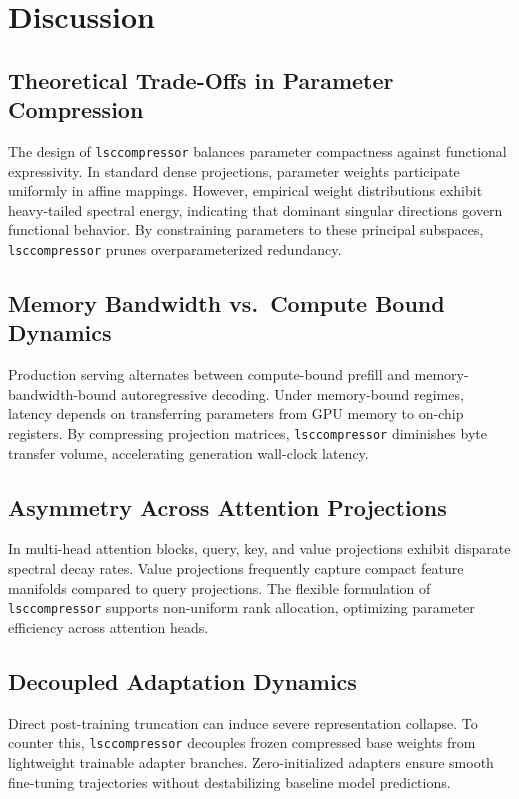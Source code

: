 \section{Discussion}

\subsection{Theoretical Trade-Offs in Parameter Compression}
The design of \texttt{lsccompressor} balances parameter compactness against functional expressivity. In standard dense projections, parameter weights participate uniformly in affine mappings. However, empirical weight distributions exhibit heavy-tailed spectral energy, indicating that dominant singular directions govern functional behavior. By constraining parameters to these principal subspaces, \texttt{lsccompressor} prunes overparameterized redundancy.

\subsection{Memory Bandwidth vs.\ Compute Bound Dynamics}
Production serving alternates between compute-bound prefill and memory-bandwidth-bound autoregressive decoding. Under memory-bound regimes, latency depends on transferring parameters from GPU memory to on-chip registers. By compressing projection matrices, \texttt{lsccompressor} diminishes byte transfer volume, accelerating generation wall-clock latency.

\subsection{Asymmetry Across Attention Projections}
In multi-head attention blocks, query, key, and value projections exhibit disparate spectral decay rates. Value projections frequently capture compact feature manifolds compared to query projections. The flexible formulation of \texttt{lsccompressor} supports non-uniform rank allocation, optimizing parameter efficiency across attention heads.

\subsection{Decoupled Adaptation Dynamics}
Direct post-training truncation can induce severe representation collapse. To counter this, \texttt{lsccompressor} decouples frozen compressed base weights from lightweight trainable adapter branches. Zero-initialized adapters ensure smooth fine-tuning trajectories without destabilizing baseline model predictions.

